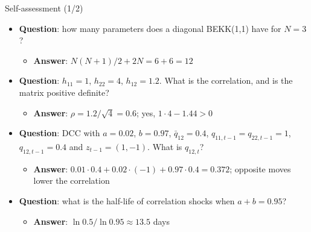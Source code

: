 \begin{frame}{Self-assessment (1/2)}
\itemsize{\footnotesize}
\begin{itemize}
    \item \textbf{Question}: how many parameters does a diagonal BEKK(1,1) have for $N = 3$?
    \begin{itemize}
        \item \textbf{Answer}: $N(N+1)/2 + 2N = 6 + 6 = 12$
    \end{itemize}
    \item \textbf{Question}: $h_{11} = 1$, $h_{22} = 4$, $h_{12} = 1.2$. What is the correlation, and is the matrix positive definite?
    \begin{itemize}
        \item \textbf{Answer}: $\rho = 1.2/\sqrt{4} = 0.6$; yes, $1 \cdot 4 - 1.44 > 0$
    \end{itemize}
    \item \textbf{Question}: DCC with $a = 0.02$, $b = 0.97$, $\bar q_{12} = 0.4$, $q_{11,t-1} = q_{22,t-1} = 1$, $q_{12,t-1} = 0.4$ and $z_{t-1} = (1, -1)$. What is $q_{12,t}$?
    \begin{itemize}
        \item \textbf{Answer}: $0.01 \cdot 0.4 + 0.02 \cdot (-1) + 0.97 \cdot 0.4 = 0.372$; opposite moves lower the correlation
    \end{itemize}
    \item \textbf{Question}: what is the half-life of correlation shocks when $a + b = 0.95$?
    \begin{itemize}
        \item \textbf{Answer}: $\ln 0.5/\ln 0.95 \approx 13.5$ days
    \end{itemize}
\end{itemize}
\end{frame}

